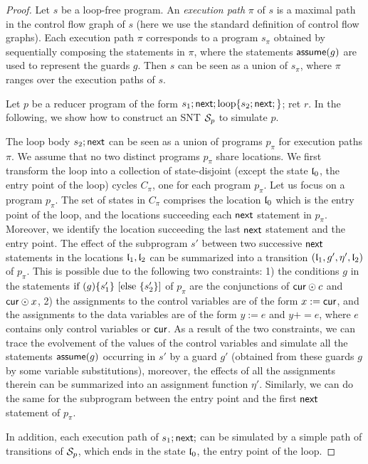 \begin{appendix}
\begin{proof}
Let $s$ be a loop-free program. An \emph{execution path} $\pi$ of $s$ is a maximal path in the control flow graph of $s$ (here we use the standard definition of control flow graphs). Each execution path $\pi$ corresponds to a program $s_\pi$ obtained by sequentially composing the statements in $\pi$, where the statements $\mathsf{assume}(g)$ are used to represent the guards $g$. Then $s$ can be seen as a union of $s_\pi$, where $\pi$ ranges over the execution paths of $s$. 

Let $p$ be a reducer program of the form $s_1; \mathsf{next}; \mbox{loop\{} s_2;\mathsf{next};\mbox{\}}$; ret $r$.  In the following, we show how to construct an SNT ${\mathcal{S} }_p$ to simulate $p$.

The loop body $s_2;\mathsf{next}$ can be seen as a union of programs $p_\pi$ for execution paths $\pi$. We assume that no two distinct programs $p_\pi$ share locations. We first transform the loop into a collection of state-disjoint (except the state $\mathfrak{l}_0$, the entry point of the loop)  cycles $C_\pi$, one for each program $p_\pi$.  Let us focus on a program $p_\pi$. The set of states in $C_\pi$ comprises the location $\mathfrak{l}_0$ which is the entry point of the loop, and the locations succeeding each $\mathsf{next}$ statement in $p_\pi$. Moreover, we identify the location succeeding the last $\mathsf{next}$ statement and the entry point. The effect of the subprogram $s'$ between two successive $\mathsf{next}$ statements in the locations $\mathfrak{l}_1,\mathfrak{l}_2$ can be summarized into a transition  $(\mathfrak{l}_1, g', \eta', \mathfrak{l}_2)$ of $p_\pi$. This is possible due to the following two constraints: 1) the conditions $g$ in the statements $\mbox{if } (g) \{s'_1\} \mbox{ [else } \{s'_2\}\mbox{]}$  of $p_\pi$ are the conjunctions of $\mathsf{cur} \odot c$ and $\mathsf{cur} \odot x$, 2) the assignments to the control variables are of the form $x:=\mathsf{cur}$, and the assignments to the data variables are of the form $y:=e$ and $y {+=} e$, where $e$ contains only control variables or $\mathsf{cur}$. As a result of the two constraints, we can trace the evolvement of the values of the control variables and simulate all the statements $\mathsf{assume}(g)$ occurring in $s'$ by a guard $g'$ (obtained from these guards $g$ by some variable substitutions),  moreover, the effects of all the assignments therein can be summarized into an assignment function $\eta'$.  Similarly, we can do the same for the subprogram between the entry point and the first $\mathsf{next}$ statement of $p_\pi$.

In addition, each execution path of $s_1;\mathsf{next};$ can be simulated by a simple path of transitions of ${\mathcal{S} }_p$, which ends in the state $\mathfrak{l}_0$, the entry point of the loop.


\end{proof}
\end{appendix}
